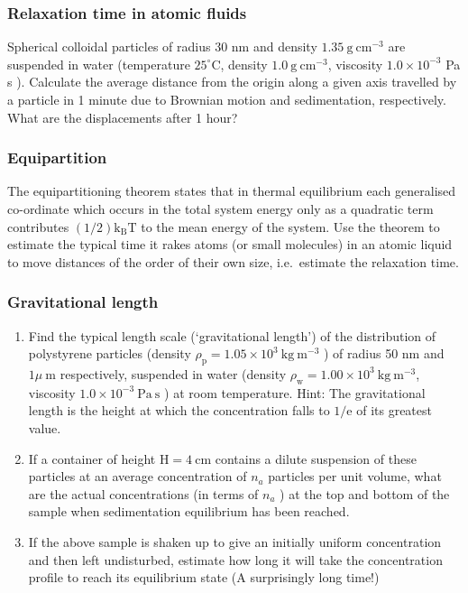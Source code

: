 \documentclass[
  letterpaper,
  DIV=11,
  numbers=noendperiod]{scrartcl}
\providecommand{\tightlist}{%
  \setlength{\itemsep}{0pt}\setlength{\parskip}{0pt}}\usepackage{longtable,booktabs,array}
\begin{document}
\subsubsection{Relaxation time in atomic
fluids}\label{relaxation-time-in-atomic-fluids}

Spherical colloidal particles of radius 30 nm and density
\(1.35 \mathrm{~g} \mathrm{~cm}^{-3}\) are suspended in water
(temperature \(25^{\circ} \mathrm{C}\), density
\(1.0 \mathrm{~g} \mathrm{~cm}^{-3}\), viscosity \(1.0 \times 10^{-3}\)
Pa s ). Calculate the average distance from the origin along a given
axis travelled by a particle in 1 minute due to Brownian motion and
sedimentation, respectively. What are the displacements after 1 hour?

\subsubsection{Equipartition}\label{equipartition}

The equipartitioning theorem states that in thermal equilibrium each
generalised co-ordinate which occurs in the total system energy only as
a quadratic term contributes
\((1 / 2) \mathrm{k}_{\mathrm{B}} \mathrm{T}\) to the mean energy of the
system. Use the theorem to estimate the typical time it rakes atoms (or
small molecules) in an atomic liquid to move distances of the order of
their own size, i.e.~estimate the relaxation time.

\subsubsection{Gravitational length}\label{gravitational-length}

\begin{enumerate}
\def\labelenumi{(\alph{enumi})}
\tightlist
\item
  Find the typical length scale (`gravitational length') of the
  distribution of polystyrene particles (density
  \(\rho_{\mathrm{p}}=1.05 \times 10^{3} \mathrm{~kg} \mathrm{~m}^{-3}\)
  ) of radius 50 nm and \(1 \mu \mathrm{~m}\) respectively, suspended in
  water (density
  \(\rho_{\mathrm{w}}=1.00 \times 10^{3} \mathrm{~kg} \mathrm{~m}^{-3}\),
  viscosity \(1.0 \times 10^{-3} \mathrm{~Pa} \mathrm{~s}\) ) at room
  temperature. Hint: The gravitational length is the height at which the
  concentration falls to \(1 / \mathrm{e}\) of its greatest value.
\item
  If a container of height \(\mathrm{H}=4 \mathrm{~cm}\) contains a
  dilute suspension of these particles at an average concentration of
  \(n_{a}\) particles per unit volume, what are the actual
  concentrations (in terms of \(n_{a}\) ) at the top and bottom of the
  sample when sedimentation equilibrium has been reached.
\item
  If the above sample is shaken up to give an initially uniform
  concentration and then left undisturbed, estimate how long it will
  take the concentration profile to reach its equilibrium state (A
  surprisingly long time!)
\end{enumerate}
\end{document}
